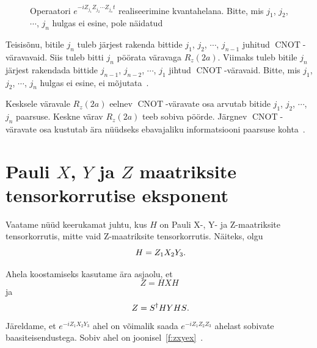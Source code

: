 \documentclass[12pt]{report}
\def\cnot{\mathop{\mathrm{CNOT}}\nolimits}
\begin{document}
\begin{figure}[h]
  \centering
  \caption{Operaatori \(e^{-iZ_{j_1}Z_{j_2}\cdots Z_{j_n}t}\) realiseerimine kvantahelana. Bitte, mis \(j_1\), \(j_2\), \(\cdots\), \(j_n\) hulgas ei esine, pole näidatud}
  \label{f:expz}
\end{figure}

Teisisõnu, bitile \(j_n\) tuleb järjest rakenda bittide \(j_1\), \(j_2\), \(\cdots\), \(j_{n-1}\) juhitud \(\cnot\)-väravavaid.
Siis tuleb bitti \(j_n\) pöörata väravaga \(R_z(2a)\).
Viimaks tuleb bitile \(j_n\) järjest rakendada bittide \(j_{n-1}\), \(j_{n-2}\), \(\cdots\), \(j_1\) jihtud \(\cnot\)-väravaid.
Bitte, mis \(j_1\), \(j_2\), \(\cdots\), \(j_n\) hulgas ei esine, ei mõjutata~\cite{mansky+etal}.

Kesksele väravale \(R_z(2a)\) eelnev \(\cnot\)-väravate osa arvutab bitide \(j_1\), \(j_2\), \(\cdots\), \(j_n\) paarsuse.
Keskne värav \(R_z(2a)\) teeb sobiva pöörde.
Järgnev \(\cnot\)-väravate osa kustutab ära nüüdseks ebavajaliku informatsiooni paarsuse kohta~\cite{nielsen+chuang}.

\section{Pauli \(X\), \(Y\) ja \(Z\) maatriksite tensorkorrutise eksponent}

Vaatame nüüd keerukamat juhtu, kus \(H\) on Pauli X-, Y- ja Z-maatriksite tensorkorrutis, mitte vaid Z-maatriksite tensorkorrutis.
Näiteks, olgu
\begin{equation}
  H=Z_1X_2Y_3\rlap{.}
\end{equation}

Ahela koostamiseks kasutame ära asjaolu, et
\begin{equation} Z=HXH \end{equation}
ja
\begin{equation} Z=S^{\dagger}HYHS\rlap{.} \end{equation}
Järeldame, et \(e^{-iZ_1X_2Y_3}\) ahel on võimalik saada \(e^{-iZ_1Z_2Z_3}\) ahelast sobivate baasiteisendustega.
Sobiv ahel on joonisel~\ref{f:zxyex}~\cite{nielsen+chuang}.
\end{document}
